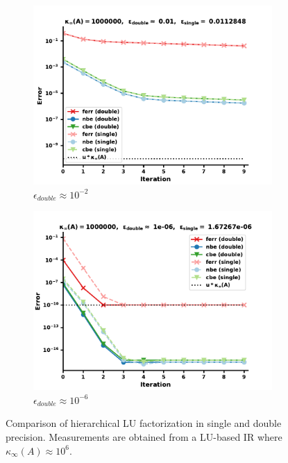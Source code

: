 \begin{figure}
\centering
\begin{subfigure}{.5\textwidth}
  \centering
  \includegraphics[width=\linewidth]{chapters/5_experiments/figures/LU512_e2_0s.pdf}
  \caption{$\epsilon_{double} \approx 10^{-2}$}
  \label{fig:lrirs3_1}
\end{subfigure}%
\begin{subfigure}{.5\textwidth}
  \centering
  \includegraphics[width=\linewidth]{chapters/5_experiments/figures/LU512_e2_1s.pdf}
  \caption{$\epsilon_{double} \approx 10^{-6}$}
  \label{fig:lrirs3_2}
\end{subfigure}
\caption[Mixed Precision Low-Rank LU-IR 3]{Comparison of hierarchical LU factorization in single and double precision. Measurements are obtained from a LU-based IR where $\kappa_\infty(A) \approx 10^6$.}
\label{fig:lrirs3}
\end{figure}

